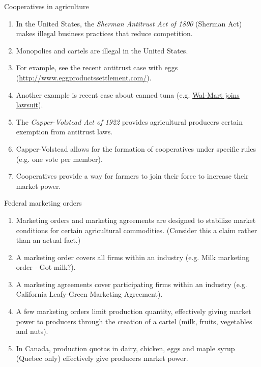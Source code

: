 \documentclass[table,xcolor=pdftex,dvipsnames]{beamer}\usepackage[]{graphicx}\usepackage[]{color}
\begin{document}
\begin{frame}{Cooperatives in agriculture}
\begin{enumerate}[label=\textbullet]
  \item In the United States, the \emph{Sherman Antitrust Act of 1890} (Sherman Act) makes illegal business practices that reduce competition.
  \item Monopolies and cartels are illegal in the United States.
  \item For example, see the recent antitrust case with eggs (\url{http://www.eggproductssettlement.com/}).
  \item Another example is recent case about canned tuna (e.g. \href{http://talkbusiness.net/2016/11/wal-mart-the-latest-in-a-growing-number-to-file-an-antitrust-suit-against-canned-tuna-suppliers/}{Wal-Mart joins lawsuit}).
  \item The \emph{Capper-Volstead Act of 1922} provides agricultural producers certain exemption from antitrust laws.
  \item Capper-Volstead allows for the formation of cooperatives under specific rules (e.g. one vote per member).
  \item Cooperatives provide a way for farmers to join their force to increase their market power.
\end{enumerate}
\end{frame}


\begin{frame}{Federal marketing orders}
\begin{enumerate}[label=\textbullet]
  \item Marketing orders and marketing agreements are designed to stabilize market conditions for certain agricultural commodities. (Consider this a claim rather than an actual fact.)
  \item A marketing order covers all firms within an industry (e.g. Milk marketing order - Got milk?).
  \item A marketing agreements cover participating firms within an industry (e.g. California Leafy-Green Marketing Agreement).
  \item A few marketing orders limit production quantity, effectively giving market power to producers through the creation of a cartel (milk, fruits, vegetables and nuts).
  \item In Canada, production quotas in dairy, chicken, eggs and maple syrup (Quebec only) effectively give producers market power.
\end{enumerate}
\end{frame}
\end{document}
